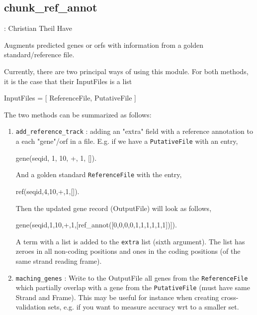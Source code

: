 


\subsection{chunk_ref_annot}

\label{sec:chunkrefannot}

\begin{tags}
: Christian Theil Have
\end{tags}

Augments predicted genes or orfs with information from a golden standard/reference file.

Currently, there are two principal ways of using this module. For both methods, it
is the case that their InputFiles is a list

\begin{code}
InputFiles = [ ReferenceFile, PutativeFile ]
\end{code}

The two methods can be summarized as follows:

\begin{enumerate}
    \item \verb$add_reference_track$ : adding an "extra" field with a reference annotation to a each "gene"/orf in a file.
E.g. if we have a \verb$PutativeFile$ with an entry,

\begin{code}
gene(seqid, 1, 10, +, 1, []).
\end{code}

And a golden standard \verb$ReferenceFile$ with the entry,

\begin{code}
ref(seqid,4,10,+,1,[]).
\end{code}

Then the updated gene record (OutputFile) will look as follows,

\begin{code}
gene(seqid,1,10,+,1,[ref_annot([0,0,0,0,1,1,1,1,1,1])]).
\end{code}

A term with a list is added to the \verb$extra$ list (sixth argument).
The list has zeroes in all non-coding positions and ones in the coding positions (of the same strand reading frame).
    \item \verb$maching_genes$ : Write to the OutputFile all genes from the \verb$ReferenceFile$ which partially overlap with a gene from the \verb$PutativeFile$ (must have same Strand and Frame).
This may be useful for instance when creating cross-validation sets, e.g. if you want to measure accuracy wrt to a smaller set.
\end{enumerate}

